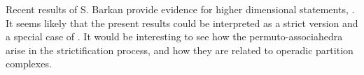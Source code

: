 Recent results of S. Barkan provide evidence for higher dimensional statements,  \cite{barkanArityApproximationInfty2022}.
It seems likely that the present results could be interpreted as a strict version and a special case of \cite[Thm.~B]{barkanArityApproximationInfty2022}. 
It would be interesting to see how the permuto-associahedra arise in the strictification process, and how they are related to operadic partition complexes.  



